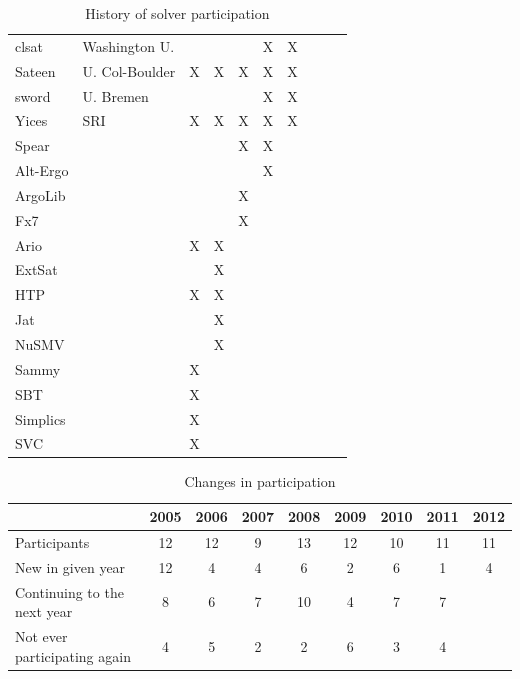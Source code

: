 \documentclass[twosize,11pt]{article}
\begin{document}
\begin{table}[t]
\begin{tabular}{|l|l|c|c|c|c|c|c|c|c|}
clsat                  & Washington U.  &   &   &   & X & X &   &   &   \\		
Sateen                 & U. Col-Boulder & X & X & X & X & X &   &   &   \\		
sword                  & U. Bremen      &   &   &   & X & X &   &   &   \\		
Yices                  & SRI            & X & X & X & X & X &   &   &   \\		
Spear                  &   &   &   & X & X &   &   &   &   \\		
Alt-Ergo               &   &   &   &   & X &   &   &   &   \\			
ArgoLib                &   &   &   & X &   &   &   &   &   \\				
Fx7                    &   &   &   & X &   &   &   &   &   \\				
Ario                   &   & X & X &   &   &   &   &   &   \\					
ExtSat                 &   &   & X &   &   &   &   &   &   \\					
HTP                    &   & X & X &   &   &   &   &   &   \\					
Jat                    &   &   & X &   &   &   &   &   &   \\					
NuSMV                  &   &   & X &   &   &   &   &   &   \\					
Sammy                  &   & X &   &   &   &   &   &   &   \\						
SBT                    &   & X &   &   &   &   &   &   &   \\						
Simplics               &   & X &   &   &   &   &   &   &   \\					
SVC	                   &   & X &   &   &   &   &   &   &   \\	
\hline					
\end{tabular}
\vspace{.2in}
\caption{History of solver participation}
\label{Table:participants}
\end{table}

\begin{table}
\centering
\begin{tabular}{|l|c|c|c|c|c|c|c|c|}
\hline
 & 2005 & 2006 & 2007 & 2008 & 2009 & 2010 & 2011 & 2012 \\
\hline
Participants                 & 12 & 12 & 9 & 13 & 12 & 10 & 11 & 11 \\
New in given year            & 12 &  4 & 4 &  6 &  2 &  6 &  1 &  4 \\
Continuing to the next year  &  8 &  6 & 7 & 10 &  4 &  7 &  7 &    \\
Not ever participating again &  4 &  5 & 2 &  2 &  6 &  3 &  4 &    \\ 
\hline
\end{tabular}
\vspace{.2in}
\caption{Changes in participation}
\label{Table:changes}
\end{table}
\end{document}
